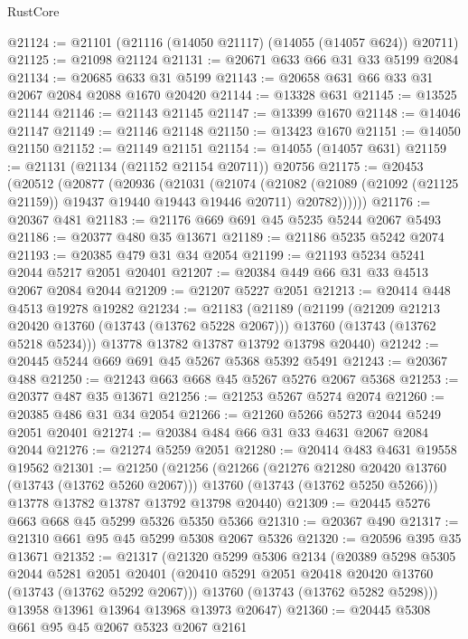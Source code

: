 \begin{lexlean}{RustCore}
\begin{coremodule}
@21124 := @21101 (@21116 (@14050 @21117) (@14055 (@14057 @624)) @20711)
@21125 := @21098 @21124
@21131 := @20671 @633 @66 @31 @33 @5199 @2084
@21134 := @20685 @633 @31 @5199
@21143 := @20658 @631 @66 @33 @31 @2067 @2084 @2088 @1670 @20420
@21144 := @13328 @631
@21145 := @13525 @21144
@21146 := @21143 @21145
@21147 := @13399 @1670
@21148 := @14046 @21147
@21149 := @21146 @21148
@21150 := @13423 @1670
@21151 := @14050 @21150
@21152 := @21149 @21151
@21154 := @14055 (@14057 @631)
@21159 := @21131 (@21134 (@21152 @21154 @20711)) @20756
@21175 := @20453
    (@20512
      (@20877
        (@20936
          (@21031
            (@21074
              (@21082
                (@21089 (@21092 (@21125 @21159)) @19437 @19440 @19443 @19446 @20711)
                @20782))))))
@21176 := @20367 @481
@21183 := @21176 @669 @691 @45 @5235 @5244 @2067 @5493
@21186 := @20377 @480 @35 @13671
@21189 := @21186 @5235 @5242 @2074
@21193 := @20385 @479 @31 @34 @2054
@21199 := @21193 @5234 @5241 @2044 @5217 @2051 @20401
@21207 := @20384 @449 @66 @31 @33 @4513 @2067 @2084 @2044
@21209 := @21207 @5227 @2051
@21213 := @20414 @448 @4513 @19278 @19282
@21234 := @21183
    (@21189
      (@21199
        (@21209 @21213 @20420 @13760 (@13743 (@13762 @5228 @2067)))
        @13760
        (@13743 (@13762 @5218 @5234)))
      @13778
      @13782
      @13787
      @13792
      @13798
      @20440)
@21242 := @20445 @5244 @669 @691 @45 @5267 @5368 @5392 @5491
@21243 := @20367 @488
@21250 := @21243 @663 @668 @45 @5267 @5276 @2067 @5368
@21253 := @20377 @487 @35 @13671
@21256 := @21253 @5267 @5274 @2074
@21260 := @20385 @486 @31 @34 @2054
@21266 := @21260 @5266 @5273 @2044 @5249 @2051 @20401
@21274 := @20384 @484 @66 @31 @33 @4631 @2067 @2084 @2044
@21276 := @21274 @5259 @2051
@21280 := @20414 @483 @4631 @19558 @19562
@21301 := @21250
    (@21256
      (@21266
        (@21276 @21280 @20420 @13760 (@13743 (@13762 @5260 @2067)))
        @13760
        (@13743 (@13762 @5250 @5266)))
      @13778
      @13782
      @13787
      @13792
      @13798
      @20440)
@21309 := @20445 @5276 @663 @668 @45 @5299 @5326 @5350 @5366
@21310 := @20367 @490
@21317 := @21310 @661 @95 @45 @5299 @5308 @2067 @5326
@21320 := @20596 @395 @35 @13671
@21352 := @21317
    (@21320
      @5299
      @5306
      @2134
      (@20389
        @5298
        @5305
        @2044
        @5281
        @2051
        @20401
        (@20410 @5291 @2051 @20418 @20420 @13760 (@13743 (@13762 @5292 @2067)))
        @13760
        (@13743 (@13762 @5282 @5298)))
      @13958
      @13961
      @13964
      @13968
      @13973
      @20647)
@21360 := @20445 @5308 @661 @95 @45 @2067 @5323 @2067 @2161

\end{coremodule}
\end{lexlean}
